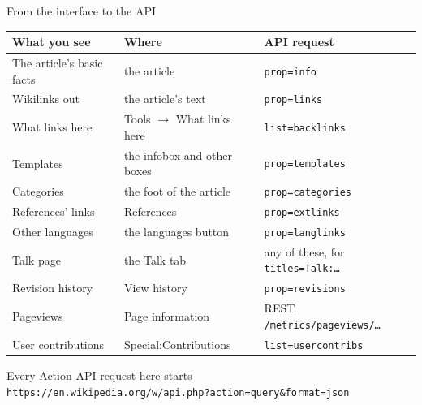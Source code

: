 \documentclass[9pt,aspectratio=169]{beamer}
\begin{document}
\begin{frame}{From the interface to the API}
    \centering\small
    \begin{tabular}{lll}
        \toprule
        \textbf{What you see} & \textbf{Where} & \textbf{API request} \\
        \midrule
        The article's basic facts & the article & \texttt{prop=info} \\
        Wikilinks out & the article's text & \texttt{prop=links} \\
        What links here & Tools $\rightarrow$ What links here & \texttt{list=backlinks} \\
        Templates & the infobox and other boxes & \texttt{prop=templates} \\
        Categories & the foot of the article & \texttt{prop=categories} \\
        References' links & References & \texttt{prop=extlinks} \\
        Other languages & the languages button & \texttt{prop=langlinks} \\
        Talk page & the Talk tab & any of these, for \texttt{titles=Talk:\ldots} \\
        Revision history & View history & \texttt{prop=revisions} \\
        Pageviews & Page information & REST \texttt{/metrics/pageviews/\ldots} \\
        User contributions & Special:Contributions & \texttt{list=usercontribs} \\
        \bottomrule
    \end{tabular}

    \medskip
    \raggedright Every Action API request here starts\\ \texttt{https://en.wikipedia.org/w/api.php?action=query\&format=json}
\end{frame}
\end{document}
